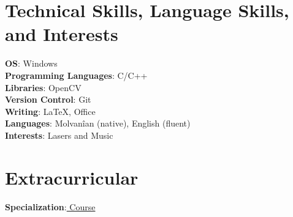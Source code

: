 \documentclass[letterpaper,10pt]{article}
\begin{document}
\section{Technical Skills, Language Skills, and Interests}
 \begin{itemize}[leftmargin=0.15in, label={}]
    \small{\item{
    \textbf{OS}{: Windows} \\
     \textbf{Programming Languages}{: C/C++} \\
     \textbf{Libraries}{: OpenCV}\\
     \textbf{Version Control}{: Git} \\
     \textbf{Writing}{: \LaTeX, Office} \\
     \textbf{Languages}{: Molvanîan (native), English (fluent)} \\
     \textbf{Interests}{: Lasers and Music}
     
    }}
 \end{itemize}

\section{Extracurricular}
 \begin{itemize}[leftmargin=0.15in, label={}]
    \small{\item{
     \textbf{Specialization}{:\href{certification site}{ Course} } 
    }}
    
 \end{itemize}
\end{document}
